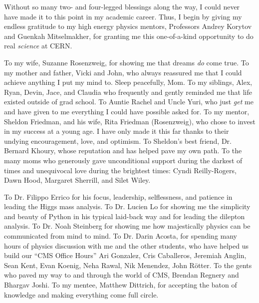Without so many two- and four-legged blessings along the way, I could never have made it to this point in my academic career.
Thus, I begin by giving my endless gratitude to my high energy physics mentors, Professors Andrey Korytov and Guenkah Mitselmakher, for granting me this one-of-a-kind opportunity to do real \emph{science} at CERN.

To my wife, Suzanne Rosenzweig, for showing me that dreams \emph{do} come true.
To my mother and father, Vicki and John, who always reassured me that I could achieve anything I put my mind to. Sleep peacefully, Mom.
To my siblings, Alex, Ryan, Devin, Jace, and Claudia who frequently and gently reminded me that life existed outside of grad school.
To Auntie Rachel and Uncle Yuri, who just \emph{get} me and have given to me everything I could have possible asked for. %
To my mentor, Sheldon Friedman, and his wife, Rita Friedman (Rosenzweig), who chose to invest in my success at a young age.
I have only made it this far thanks to their undying encouragement, love, and optimism.
To Sheldon's best friend, Dr. Bernard Khoury, whose reputation and has helped pave my own path.
To the many moms who generously gave unconditional support during the darkest of times and unequivocal love during the brightest times:
Cyndi Reilly-Rogers, Dawn Hood, Margaret Sherrill, and Silet Wiley.

To Dr. Filippo Errico for his focus, leadership, selflessness, and patience in leading the Higgs mass analysis.
To Dr. Lucien Lo for showing me the simplicity and beauty of Python in his typical laid-back way and for leading the dilepton analysis. %
To Dr. Noah Steinberg for showing me how majestically physics can be communicated from mind to mind.
To Dr. Darin Acosta, for spending many hours of physics discussion with me and the other students, who have helped us build our ``CMS Office Hours''
Ari Gonzalez, Cris Caballeros, Jeremiah Anglin, Sean Kent, 
Evan Koenig, Neha Rawal, Nik Menendez, John Rötter.  %
To the gents who paved my way to and through the world of CMS, Brendan Regnery and Bhargav Joshi.
To my mentee, Matthew Dittrich, for accepting the baton of knowledge and making everything come full circle.

